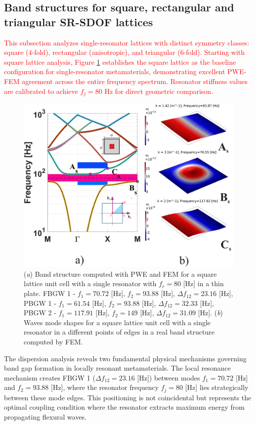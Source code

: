 \documentclass[review,numbers,sort&compress]{elsarticle}
\begin{document}
\subsection{Band structures for square, rectangular and triangular SR-SDOF lattices}
\label{srt_disp_pwe}
\textcolor{red}{This subsection analyzes single-resonator lattices with distinct symmetry classes: square (4-fold), rectangular (anisotropic), and triangular (6-fold). Starting with square lattice analysis, Figure \ref{pwe_fem_disp_modal_square} establishes the square lattice as the baseline configuration for single-resonator metamaterials, demonstrating excellent PWE-FEM agreement across the entire frequency spectrum. Resonator stiffness values are calibrated to achieve $f_j = 80$ Hz for direct geometric comparison.}
\newpage
\begin{figure}[htb]
	\centering
	\includegraphics[width=1.1\textwidth]{1_1_disp_frf_square.pdf}
	\caption{(\textit{a}) Band structure computed with PWE and FEM for a square lattice unit cell with a single resonator with $f_r = 80$ [Hz] in a thin plate. FBGW 1 - $f_1 = 70.72$ [Hz], $f_2 = 93.88$ [Hz], $\Delta f_{12} = 23.16 $ [Hz], PBGW 1 - $f_1 = 61.54$ [Hz], $f_2 = 93.88$ [Hz], $\Delta f_{12} = 32.33 $ [Hz], PBGW 2 - $f_1 = 117.91$ [Hz], $f_2 = 149$ [Hz], $\Delta f_{12} = 31.09 $ [Hz]. (\textit{b}) Waves mode shapes for a square lattice unit cell with a single resonator in a different points of edges in a real band structure computed by FEM.}
	\label{pwe_fem_disp_modal_square}
\end{figure}
The dispersion analysis reveals two fundamental physical mechanisms governing band gap formation in locally resonant metamaterials. The local resonance mechanism creates FBGW 1 ($\Delta f_{12} = 23.16$ [Hz]) between modes $f_1 = 70.72$ [Hz] and $f_2 = 93.88$ [Hz], where the resonator frequency $f_j = 80$ [Hz] lies strategically between these mode edges. This positioning is not coincidental but represents the optimal coupling condition where the resonator extracts maximum energy from propagating flexural waves.
\end{document}
